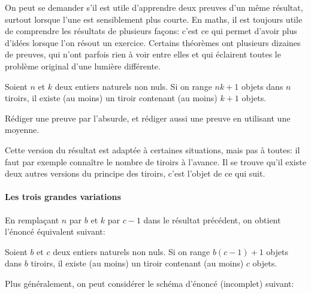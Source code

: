 On peut se demander s'il est utile d'apprendre deux preuves d'un même résultat, surtout lorsque l'une est sensiblement plus courte. En maths, il est toujours utile de comprendre les résultats de plusieurs façons: c'est ce qui permet d'avoir plus d'idées lorsque l'on résout un exercice. Certains théorèmes ont plusieurs dizaines de preuves, qui n'ont parfois rien à voir entre elles et qui éclairent toutes le problème original d'une lumière différente.

\begin{proposition}\label{tiroirs2}
Soient $n$ et $k$ deux entiers naturels non nuls. Si on range $nk+1$ objets dans $n$ tiroirs, il existe (au moins) un tiroir contenant (au moins) $k+1$ objets.
\end{proposition}

\begin{exo} Rédiger une preuve par l'absurde, et rédiger aussi une preuve en utilisant une moyenne.
\end{exo}


Cette version  du résultat est adaptée à certaines situations, mais pas à toutes: il faut par exemple connaître le nombre de tiroirs à l'avance. Il se trouve qu'il existe deux autres versions du principe des tiroirs, c'est l'objet de ce qui suit.

\paragraph{Les trois grandes variations}

En remplaçant $n$ par $b$ et $k$ par $c-1$ dans le résultat précédent, on obtient l'énoncé équivalent suivant:

\begin{proposition}\label{tiroirs_a}
Soient $b$ et $c$ deux entiers naturels non nuls. Si on range $b(c-1)+1$ objets dans $b$ tiroirs, il existe (au moins) un tiroir contenant (au moins) $c$ objets.
\end{proposition}

Plus généralement, on peut considérer le schéma d'énoncé (incomplet) suivant:
\begin{center}
\end{center}

